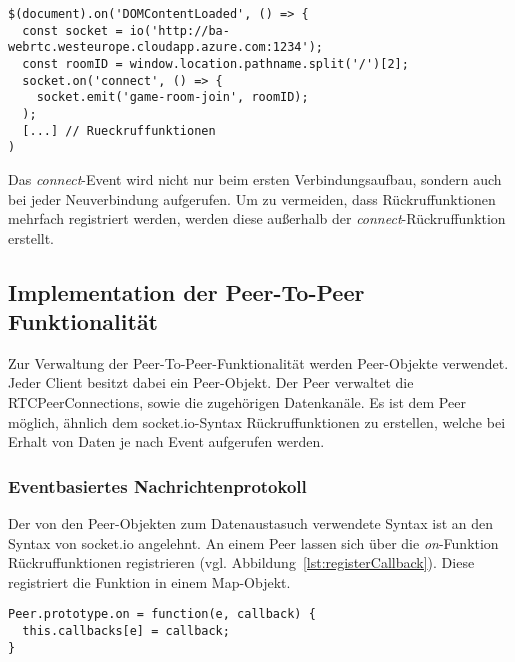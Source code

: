 \vspace{5pt}
\lstset{language=js, style=STYLE_CODE_JS}
\begin{minipage}{\textwidth}
\begin{singlespace}
\begin{lstlisting}[caption={Clientseitiger Verbindungsaufbau -- game.js}, captionpos=b, label={lst:socketioclient}]
$(document).on('DOMContentLoaded', () => {
  const socket = io('http://ba-webrtc.westeurope.cloudapp.azure.com:1234');
  const roomID = window.location.pathname.split('/')[2];
  socket.on('connect', () => {
    socket.emit('game-room-join', roomID);
  );
  [...] // Rueckruffunktionen
)
\end{lstlisting}
\end{singlespace}
\end{minipage}

Das \textit{connect}-Event wird nicht nur beim ersten Verbindungsaufbau, sondern auch bei jeder Neuverbindung aufgerufen. Um zu vermeiden, dass Rückruffunktionen mehrfach registriert werden, werden diese außerhalb der \textit{connect}-Rückruffunktion erstellt. 

\subsection{Implementation der Peer-To-Peer Funktionalität}
Zur Verwaltung der Peer-To-Peer-Funktionalität werden \glqq{}Peer\grqq{}-Objekte verwendet. Jeder Client besitzt dabei ein Peer-Objekt. Der Peer verwaltet die RTCPeerConnections, sowie die zugehörigen Datenkanäle. Es ist dem Peer möglich, ähnlich dem socket.io-Syntax Rückruffunktionen zu erstellen, welche bei Erhalt von Daten je nach Event aufgerufen werden.\par

\subsubsection{Eventbasiertes Nachrichtenprotokoll}
Der von den Peer-Objekten zum Datenaustasuch verwendete Syntax ist an den Syntax von socket.io angelehnt. An einem Peer lassen sich über die \textit{on}-Funktion Rückruffunktionen registrieren (vgl. Abbildung~\ref{lst:registerCallback}). Diese registriert die Funktion in einem Map-Objekt.\par

\vspace{5pt}
\lstset{language=js, style=STYLE_CODE_JS}
\begin{singlespace}
\begin{lstlisting}[caption={Funktion zur Registrierung von Rückruffunktionen -- Peer.js}, captionpos=b, label={lst:registerCallback}]
Peer.prototype.on = function(e, callback) {
  this.callbacks[e] = callback;
}
\end{lstlisting}
\end{singlespace}

